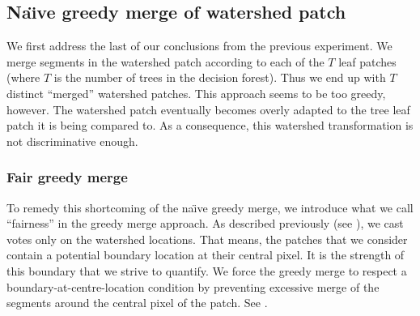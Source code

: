 \subsection{Na\"{\i}ve greedy merge of watershed patch}
\label{sec:ch5-naive-greedy-merge}
We first address the last of our conclusions from the previous experiment. We merge segments in the watershed patch according to each of the $T$ leaf patches (where $T$ is the number of trees in the decision forest). Thus we end up with $T$ distinct ``merged'' watershed patches. This approach seems to be too greedy, however. The watershed patch eventually becomes overly adapted to the tree leaf patch it is being compared to. As a consequence, this watershed transformation is not discriminative enough.

\subsubsection{Fair greedy merge}
To remedy this shortcoming of the na\"{\i}ve greedy merge, we introduce what we call ``fairness'' in the greedy merge approach. As described previously (see ), we cast votes only on the watershed locations. That means, the patches that we consider contain a potential boundary location at their central pixel. It is the strength of this boundary that we strive to quantify. We force %
the greedy merge to respect a boundary-at-centre-location condition by preventing excessive merge of the segments around the central pixel of the patch. See .

